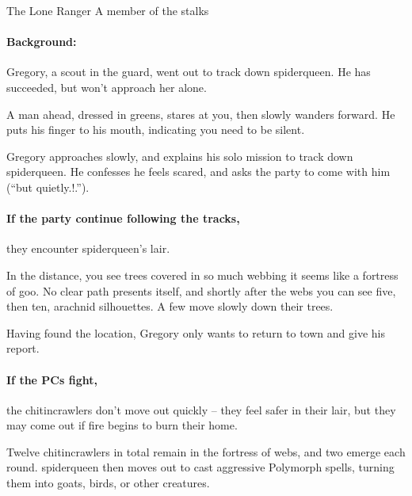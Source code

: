 \begin{multicols}{2}


{The Lone Ranger}%
{A member of the  stalks }%

\paragraph{Background:}
Gregory, a scout in the \gls{guard}, went out to track down \gls{spiderqueen}.
He has succeeded, but won't approach her alone.

\begin{boxtext}

  A man ahead, dressed in greens, stares at you, then slowly wanders forward.  He puts his finger to his mouth, indicating you need to be silent.

\end{boxtext}

Gregory approaches slowly, and explains his solo mission to track down \gls{spiderqueen}.
He confesses he feels scared, and asks the party to come with him (``but quietly.!.'').

\paragraph{If the party continue following the tracks,}
they encounter \gls{spiderqueen}'s lair.

\begin{boxtext}
  In the distance, you see trees covered in so much webbing it seems like a fortress of goo.
  No clear path presents itself, and shortly after the webs you can see five, then ten, arachnid silhouettes.
  A few move slowly down their trees.
\end{boxtext}

Having found the location, Gregory only wants to return to \gls{town} and give his report.

\paragraph{If the PCs fight,}
the chitincrawlers don't move out quickly -- they feel safer in their lair, but they may come out if fire begins to burn their home.

Twelve chitincrawlers in total remain in the fortress of webs, and two emerge each round.
\Gls{spiderqueen} then moves out to cast aggressive Polymorph spells, turning them into goats, birds, or other creatures.


\end{multicols}
